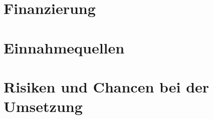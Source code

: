 \section{Finanzierung}
\section{Einnahmequellen}
\section{Risiken und Chancen bei der Umsetzung}




